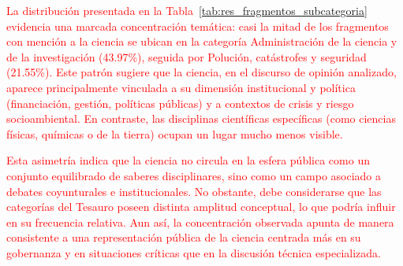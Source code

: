 \documentclass[11pt,a4paper]{article}
\begin{document}

\textcolor{red}{La distribución presentada en la Tabla~\ref{tab:res_fragmentos_subcategoria} evidencia una marcada concentración temática: casi la mitad de los fragmentos con mención a la ciencia se ubican en la categoría Administración de la ciencia y de la investigación (43.97\%), seguida por Polución, catástrofes y seguridad (21.55\%). Este patrón sugiere que la ciencia, en el discurso de opinión analizado, aparece principalmente vinculada a su dimensión institucional y política (financiación, gestión, políticas públicas) y a contextos de crisis y riesgo socioambiental. En contraste, las disciplinas científicas específicas (como ciencias físicas, químicas o de la tierra) ocupan un lugar mucho menos visible.}

\textcolor{red}{Esta asimetría indica que la ciencia no circula en la esfera pública como un conjunto equilibrado de saberes disciplinares, sino como un campo asociado a debates coyunturales e institucionales. No obstante, debe considerarse que las categorías del Tesauro poseen distinta amplitud conceptual, lo que podría influir en su frecuencia relativa. Aun así, la concentración observada apunta de manera consistente a una representación pública de la ciencia centrada más en su gobernanza y en situaciones críticas que en la discusión técnica especializada.}


\end{document}

